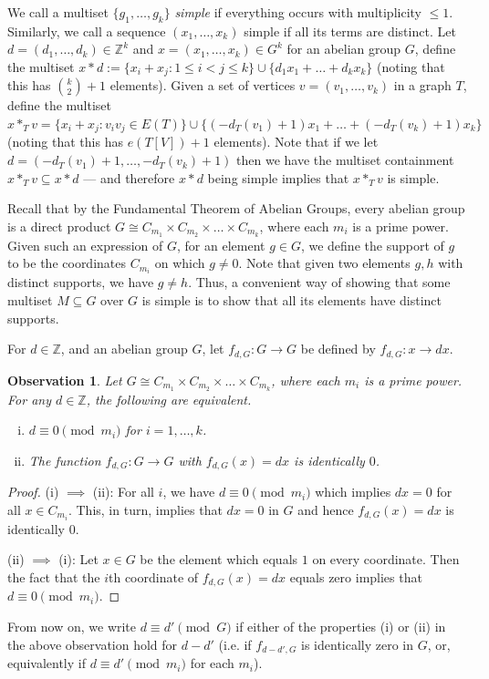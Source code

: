 \documentclass[a4paper,11pt,hidelinks]{amsart}
\newtheorem{observation}[theorem]{Observation}
\theoremstyle{definition}
\begin{document}
 We call a multiset $\{g_1, \dots, g_k\}$ \textit{simple} if everything occurs with multiplicity $\leq 1$. Similarly, we call a sequence $(x_1, \dots, x_k)$ simple if all its terms are distinct.
Let $d=(d_1,\dots, d_k)\in \mathbb{Z}^k$ and $x=(x_1, \dots, x_k)\in G^k$ for an abelian group $G$, define the multiset $x\ast d:= \{x_i+x_j: 1\leq i< j\leq k\}\cup \{d_1x_1+\dots+d_kx_k\}$   (noting that this has $\binom k2+1$ elements). Given a set of vertices $v=(v_1, \dots, v_k)$ in a graph $T$,   define the multiset $x\ast_T v=\{x_i+x_j: v_iv_j\in E(T)\}\cup \{(-d_T(v_1)+1)x_1+\dots+(-d_T(v_k)+1)x_k\}$ (noting that this has $e(T[V])+1$ elements). Note that if we let $d=(-d_T(v_1)+1, \dots, -d_T(v_k)+1)$ then we have the multiset containment $x\ast_T v\subseteq x\ast d$ --- and therefore $x\ast d$ being simple implies that $x\ast_T v$ is simple. 



 Recall that by the Fundamental Theorem of Abelian Groups, every abelian group is a direct product  $G\cong C_{m_1}\times C_{m_2}\times \dots \times C_{m_k}$, where each $m_i$ is a prime power. Given such an expression of $G$, for an element $g\in G$, we define the support of $g$ to be the coordinates $C_{m_i}$ on which $g\neq 0$. 
Note that given two elements $g,h$ with distinct supports, we have $g\neq h$. Thus, a convenient way of showing that some multiset $M\subseteq G$ over $G$ is simple is to show that all its elements have distinct supports.

For $d\in \mathbb{Z}$, and an abelian group $G$, let $f_{d,G}:G\to G$ be defined by $f_{d,G}:x\to dx$. 
\begin{observation}\label{Observation_mod_G_charterization} 
Let $G\cong C_{m_1}\times C_{m_2}\times \dots \times C_{m_k}$, where each $m_i$ is a prime power. For any $d\in \mathbb{Z}$, the following are equivalent.
\begin{enumerate}[(i)]
\item $d\equiv 0 \pmod{m_i}$ for $i=1, \dots, k$.
\item The function $f_{d,G}: G\to G$ with $f_{d,G}(x)=dx$ is identically $0$.
\end{enumerate}
\end{observation}
\begin{proof}
(i) $\implies$ (ii): For all $i$, we have $d\equiv 0 \pmod{m_i}$ which implies $dx= 0$ for all  $x\in C_{m_i}$. This, in turn, implies that $dx=0$ in $G$ and hence  $f_{d,G}(x)=dx$ is identically $0$.

(ii) $\implies$ (i): Let $x\in G$ be the element which equals $1$ on every coordinate. Then the fact that the $i$th  coordinate of $f_{d,G}(x)=dx$ equals zero implies that $d\equiv 0 \pmod{m_i}$. 
\end{proof}
From now on, we write $d\equiv d'\pmod G$ if either of the properties (i) or (ii) in the above observation hold for $d-d'$ (i.e. if $f_{d-d',G}$ is identically zero in $G$, or, equivalently if $d\equiv d'\pmod {m_i}$ for each $m_i$).  
\end{document}
